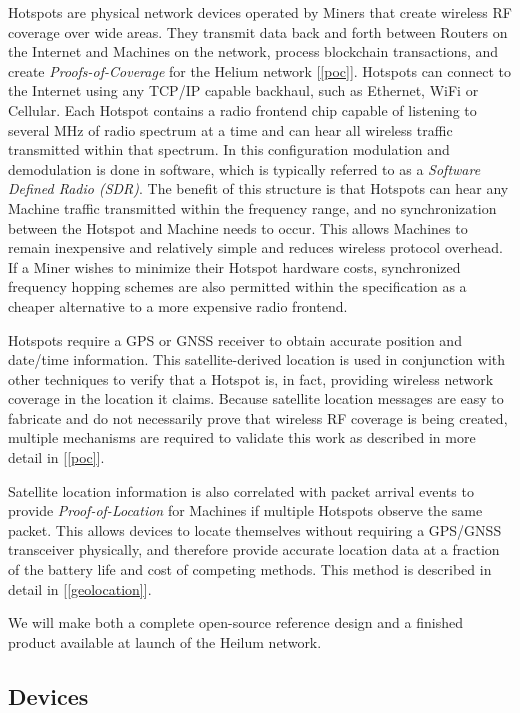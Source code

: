 \documentclass[10pt, nonatbib, nocopyrightspace, reprint]{sigplanconf}
\newcommand{\secref}[1]{[\autoref{#1}]}
\begin{document}
Hotspots are physical network devices operated by Miners that create wireless RF coverage over wide areas. They transmit data back and forth between Routers on the Internet and Machines on the network, process blockchain transactions, and create \emph{Proofs-of-Coverage} for the Helium network \secref{poc}. Hotspots can connect to the Internet using any TCP/IP capable backhaul, such as Ethernet, WiFi or Cellular. Each Hotspot contains a radio frontend chip capable of listening to several MHz of radio spectrum at a time and can hear all wireless traffic transmitted within that spectrum. In this configuration modulation and demodulation is done in software, which is typically referred to as a \emph{Software Defined Radio (SDR)}. The benefit of this structure is that Hotspots can hear any Machine traffic transmitted within the frequency range, and no synchronization between the Hotspot and Machine needs to occur. This allows Machines to remain inexpensive and relatively simple and reduces wireless protocol overhead. If a Miner wishes to minimize their Hotspot hardware costs, synchronized frequency hopping schemes are also permitted within the specification as a cheaper alternative to a more expensive radio frontend.

Hotspots require a GPS or GNSS receiver to obtain accurate position and date/time information. This satellite-derived location is used in conjunction with other techniques to verify that a Hotspot is, in fact, providing wireless network coverage in the location it claims. Because satellite location messages are easy to fabricate and do not necessarily prove that wireless RF coverage is being created, multiple mechanisms are required to validate this work as described in more detail in \secref{poc}.

Satellite location information is also correlated with packet arrival events to provide \emph{Proof-of-Location} for Machines if multiple Hotspots observe the same packet. This allows devices to locate themselves without requiring a GPS/GNSS transceiver physically, and therefore provide accurate location data at a fraction of the battery life and cost of competing methods. This method is described in detail in \secref{geolocation}.

We will make both a complete open-source reference design and a finished product available at launch of the Heilum network.

\subsection{Devices}\label{devices}
\end{document}
